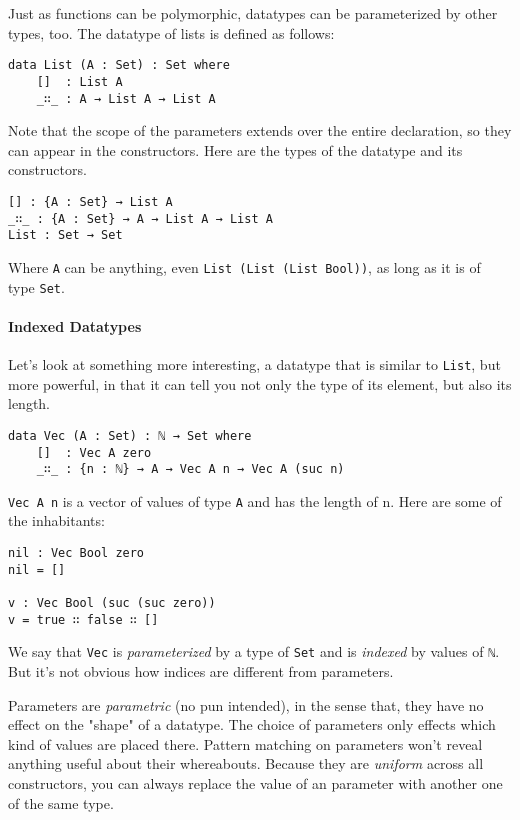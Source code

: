 \documentclass[12pt, a4paper]{article}
\begin{document}
Just as functions can be polymorphic, datatypes can be parameterized by other
types, too. The datatype of lists is defined as follows:

\begin{lstlisting}
data List (A : Set) : Set where
    []  : List A
    _∷_ : A → List A → List A
\end{lstlisting}

Note that the scope of the parameters extends over the entire declaration, so
they can appear in the constructors.
Here are the types of the datatype and its constructors.

\begin{lstlisting}
[] : {A : Set} → List A
_∷_ : {A : Set} → A → List A → List A
List : Set → Set
\end{lstlisting}

Where {\lstinline|A|} can be anything, even {\lstinline|List (List (List Bool))|},
as long as it is of type {\lstinline|Set|}.

\paragraph{Indexed Datatypes}

Let's look at something more interesting, a datatype that is similar to
{\lstinline|List|}, but more powerful, in that it can tell you not only the type
of its element, but also its length.

\begin{lstlisting}
data Vec (A : Set) : ℕ → Set where
    []  : Vec A zero
    _∷_ : {n : ℕ} → A → Vec A n → Vec A (suc n)
\end{lstlisting}

{\lstinline|Vec A n|} is a vector of values of type {\lstinline|A|} and
has the length of n. Here are some of the inhabitants:

\begin{lstlisting}
nil : Vec Bool zero
nil = []

v : Vec Bool (suc (suc zero))
v = true ∷ false ∷ []
\end{lstlisting}

We say that {\lstinline|Vec|} is \textit{parameterized} by a type of {\lstinline|Set|}
and is \textit{indexed} by values of {\lstinline|ℕ|}. But it's not obvious how indices are
different from parameters.

Parameters are \textit{parametric} (no pun intended), in the sense that, they
have no effect on the "shape" of a datatype. The choice of parameters only effects
which kind of values are placed there. Pattern matching on parameters won't reveal
anything useful about their whereabouts. Because they are \textit{uniform} across
all constructors, you can always replace the value of an parameter with another one
of the same type.
\end{document}
